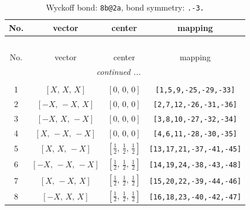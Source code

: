 \documentclass[fleqn,8pt]{jsarticle}
\begin{document}
\begin{longtable}{cccc}
\caption{Wyckoff bond: {\tt 8b@2a}, bond symmetry: {\tt .-3.}}
 \\
 \hline \hline
No. & vector & center & mapping \\ \hline \endfirsthead

\multicolumn{3}{l}{\tablename\ \thetable{}} \\
 \hline \hline
No. & vector & center & mapping \\ \hline \endhead

 \hline \hline
\multicolumn{3}{r}{\footnotesize\it continued ...} \\ \endfoot

 \hline \hline
\multicolumn{3}{r}{} \\ \endlastfoot

1 & $\left[ X,\, X,\, X \right]$ & $\left[ 0,\, 0,\, 0 \right]$ & {\tt [1,5,9,-25,-29,-33]} \\ \hline
2 & $\left[ - X,\, - X,\, X \right]$ & $\left[ 0,\, 0,\, 0 \right]$ & {\tt [2,7,12,-26,-31,-36]} \\ \hline
3 & $\left[ - X,\, X,\, - X \right]$ & $\left[ 0,\, 0,\, 0 \right]$ & {\tt [3,8,10,-27,-32,-34]} \\ \hline
4 & $\left[ X,\, - X,\, - X \right]$ & $\left[ 0,\, 0,\, 0 \right]$ & {\tt [4,6,11,-28,-30,-35]} \\ \hline
5 & $\left[ X,\, X,\, - X \right]$ & $\left[ \frac{1}{2},\, \frac{1}{2},\, \frac{1}{2} \right]$ & {\tt [13,17,21,-37,-41,-45]} \\ \hline
6 & $\left[ - X,\, - X,\, - X \right]$ & $\left[ \frac{1}{2},\, \frac{1}{2},\, \frac{1}{2} \right]$ & {\tt [14,19,24,-38,-43,-48]} \\ \hline
7 & $\left[ X,\, - X,\, X \right]$ & $\left[ \frac{1}{2},\, \frac{1}{2},\, \frac{1}{2} \right]$ & {\tt [15,20,22,-39,-44,-46]} \\ \hline
8 & $\left[ - X,\, X,\, X \right]$ & $\left[ \frac{1}{2},\, \frac{1}{2},\, \frac{1}{2} \right]$ & {\tt [16,18,23,-40,-42,-47]} \\
\end{longtable}
\renewcommand{\arraystretch}{1.2}
\end{document}
